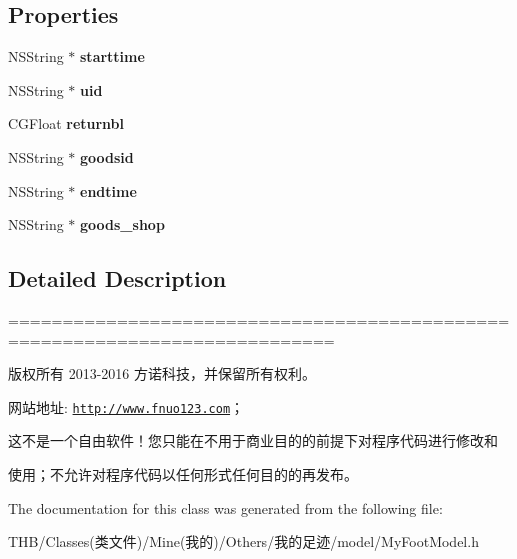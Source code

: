 \subsection*{Properties}
\begin{DoxyCompactItemize}
\item 
\mbox{\label{interface_my_foot_model_ad270c940c4d24179274204c62fe62860}} 
N\+S\+String $\ast$ {\bfseries starttime}
\item 
\mbox{\label{interface_my_foot_model_aac72125fb5c0ed2ac6d7d7b6dc55551c}} 
N\+S\+String $\ast$ {\bfseries uid}
\item 
\mbox{\label{interface_my_foot_model_aa3ae9e58f4eb5cfc59ed25039479aef7}} 
C\+G\+Float {\bfseries returnbl}
\item 
\mbox{\label{interface_my_foot_model_a1a0c90789a3e67d5db029ca1cedd635b}} 
N\+S\+String $\ast$ {\bfseries goodsid}
\item 
\mbox{\label{interface_my_foot_model_aba6bd8f9a89965a2339c0dd5812b5dcc}} 
N\+S\+String $\ast$ {\bfseries endtime}
\item 
\mbox{\label{interface_my_foot_model_a9da22cb92e04bed1cf6eafa946754fc8}} 
N\+S\+String $\ast$ {\bfseries goods\+\_\+shop}
\end{DoxyCompactItemize}


\subsection{Detailed Description}
============================================================================

版权所有 2013-\/2016 方诺科技，并保留所有权利。

网站地址\+: \href{http://www.fnuo123.com}{\tt http\+://www.\+fnuo123.\+com}； 



这不是一个自由软件！您只能在不用于商业目的的前提下对程序代码进行修改和

使用；不允许对程序代码以任何形式任何目的的再发布。 

 

The documentation for this class was generated from the following file\+:\begin{DoxyCompactItemize}
\item 
T\+H\+B/\+Classes(类文件)/\+Mine(我的)/\+Others/我的足迹/model/My\+Foot\+Model.\+h\end{DoxyCompactItemize}
